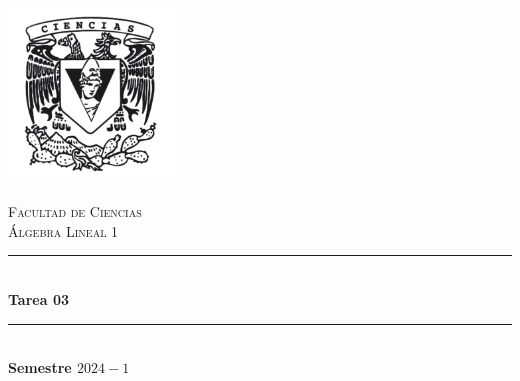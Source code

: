 \begin{titlepage}
    \center %
    \newcommand{\HRule}{\rule{\linewidth}{0.5mm}} 
    
    \includegraphics[width=4.5cm]{IMA/Ciencias.png} \\ 
    \quad \\[1.5cm]
    \textsc{\Large Facultad de Ciencias}\\[0.5cm] %
    \textsc{\Large Álgebra Lineal 1}\\[0.5cm] %
    \makeatletter
        \HRule\\ [0.4cm]
            { \huge \bfseries Tarea 03}\\
        \HRule\\ [0.4cm]
    \large\textbf{Semestre $2024-1$}\\
    

\end{titlepage}

